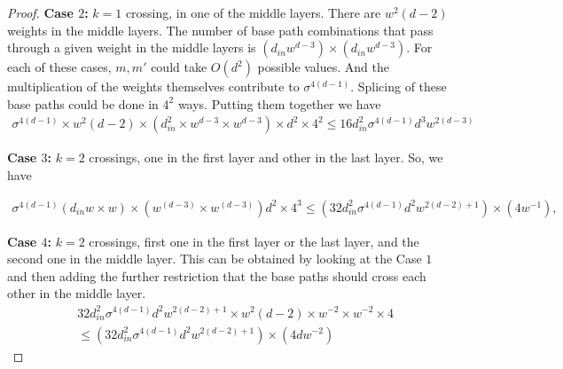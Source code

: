 \begin{appendix}
\begin{proof}
\textbf{Case $2$:} $k=1$ crossing, in one of the middle layers. There are $w^2(d-2)$ weights in the middle layers. The number of base path combinations  that pass through a given weight in the middle layers is $(d_{in}w^{d-3})\times(d_{in} w^{d-3})$. For each of these cases, $m,m'$ could take $O(d^2)$ possible values. And the multiplication of the weights themselves contribute to $\sigma^{4(d-1)}$. Splicing of these base paths could be done in $4^2$ ways. Putting them together we have
\begin{align*}
\sigma^{4(d-1)} \times w^2(d-2)\times (d^2_{in}\times w^{d-3}\times w^{d-3})\times d^2 \times 4^2\leq 16d^2_{in}\sigma^{4(d-1)} d^3 w^{2(d-3)}
\end{align*}

\textbf{Case $3$:} $k=2$ crossings, one in the first layer and other in the last layer. %
So, we have

\begin{align*}
\sigma^{4(d-1)} (d_{in}w \times w) \times (w^{(d-3)} \times w^{(d-3)}) d^2 \times 4^3 \leq (32d^2_{in}\sigma^{4(d-1)}d^2 w^{2(d-2)+1})\times (4w^{-1}),
\end{align*}




\textbf{Case $4$:} $k=2$ crossings, first one in the first layer or the last layer, and the second one in the middle layer. This can be obtained by looking at the Case $1$ and then adding the further restriction that the base paths should cross each other in the middle layer. 
\begin{align*}
&32d^2_{in}\sigma^{4(d-1)}d^2 w^{2(d-2)+1}\times w^2(d-2) \times w^{-2}\times w^{-2}\times 4\\
&\leq (32d^2_{in}\sigma^{4(d-1)}d^2 w^{2(d-2)+1} )\times (4dw^{-2}) 
\end{align*}


\end{proof}
\end{appendix}
